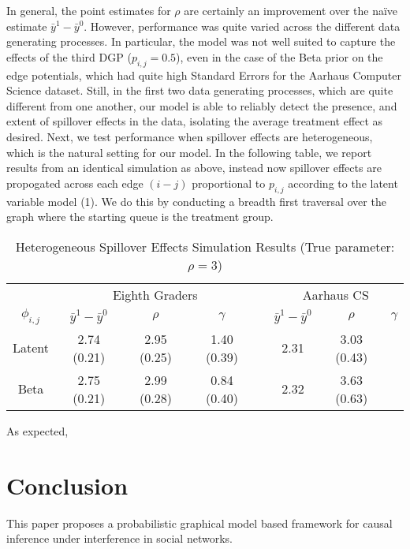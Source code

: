 \documentclass{article}
\begin{document}
In general, the point estimates for $\rho$ are certainly an improvement over the naïve estimate $\bar{y}^{1} - \bar{y}^{0}$. However, 
performance was quite varied across the different data generating processes. In particular, the model was not well suited to capture the effects of the third DGP ($p_{i,j} = 0.5$), even in the 
case of the Beta prior on the edge potentials, which had quite high Standard Errors for the Aarhaus Computer Science dataset. Still, in the first two data generating processes, 
which are quite different from one another, our model is able to reliably detect the presence, and extent of spillover effects in the data, isolating the average treatment effect as desired. 
Next, we test performance when spillover effects are heterogeneous, which is the natural setting for our model. In the following table, we report results from an identical simulation as above, instead 
now spillover effects are propogated across each edge $(i-j)$ proportional to $p_{i,j}$ according to the latent variable model (1). We do this by conducting a breadth first traversal over the graph where 
the starting queue is the treatment group. 
\begin{table}[htbp]
  \caption{Heterogeneous Spillover Effects Simulation Results (True parameter: $\rho = 3$)}
  \label{table2}
  \centering
  \begin{tabular}{cccccccc}
    \toprule
    & \multicolumn{3}{c}{Eighth Graders} & & \multicolumn{3}{c}{Aarhaus CS}              \\
    \cmidrule{2-4} \cmidrule{6-8}
    $\phi_{i,j}$ & $\bar{y}^1 - \bar{y}^0$ & $\rho$ & $\gamma$ & & $\bar{y}^1 - \bar{y}^0$ & $\rho$ & $\gamma$ \\
    \midrule
     Latent & 2.74 (0.21) & 2.95 (0.25) & 1.40 (0.39) & & 2.31 & 3.03 (0.43)    \\
    \cmidrule{1-8}
    Beta & 2.75 (0.21) & 2.99 (0.28) & 0.84 (0.40) & & 2.32 & 3.63 (0.63)  \\
    \bottomrule
  \end{tabular}
\end{table}

As expected, 

\section{Conclusion}

This paper proposes a probabilistic graphical model based framework for causal inference under interference in social networks. 
\end{document}
